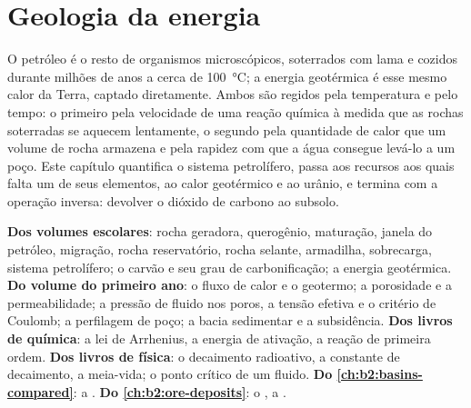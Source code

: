 \chapter{Geologia da energia}\label{ch:b2:energy-geology}

O petróleo é o resto de organismos microscópicos, soterrados com lama e cozidos durante milhões de anos a
cerca de \qty{100}{\celsius}; a energia geotérmica é esse mesmo calor da Terra, captado diretamente.
Ambos são regidos pela temperatura e pelo tempo: o primeiro pela velocidade de uma reação química à medida que
as rochas soterradas se aquecem lentamente, o segundo pela quantidade de calor que um volume de rocha armazena e pela rapidez com que a água
consegue levá-lo a um poço. Este capítulo quantifica o sistema petrolífero, passa aos recursos aos quais
falta um de seus elementos, ao calor geotérmico e ao urânio, e termina com a operação inversa:
devolver o dióxido de carbono ao subsolo.

\begin{recall}
\textbf{Dos volumes escolares}: rocha geradora, querogênio, maturação, janela do petróleo, migração,
rocha reservatório, rocha selante, armadilha, sobrecarga, sistema petrolífero; o carvão e seu grau de carbonificação; a energia geotérmica.
\textbf{Do volume do primeiro ano}: o fluxo de calor e o geotermo; a porosidade e a permeabilidade; a pressão
de fluido nos poros, a tensão efetiva e o critério de Coulomb; a perfilagem de poço; a bacia sedimentar e a
subsidência. \textbf{Dos livros de química}: a lei de Arrhenius, a energia de ativação, a reação de primeira
ordem. \textbf{Dos livros de física}: o decaimento radioativo, a constante de decaimento, a meia-vida; o
ponto crítico de um fluido. \textbf{Do \cref{ch:b2:basins-compared}}: a .
\textbf{Do \cref{ch:b2:ore-deposits}}: o , a .
\end{recall}

